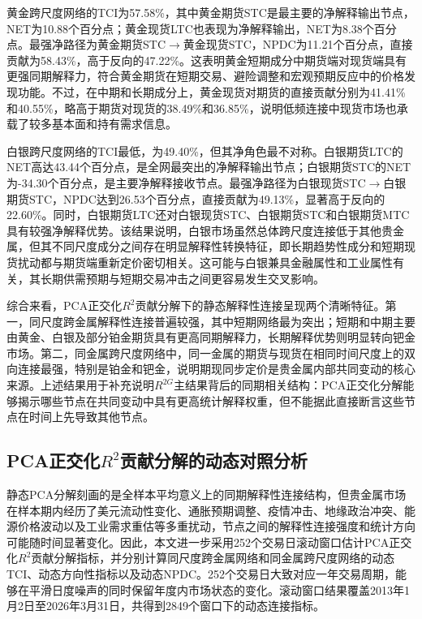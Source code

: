 \documentclass[UTF8,zihao=-4,fontset=fandol]{ctexart}
\begin{document}
黄金跨尺度网络的TCI为57.58\%，其中黄金期货STC是最主要的净解释输出节点，NET为10.88个百分点；黄金现货LTC也表现为净解释输出，NET为8.38个百分点。最强净路径为黄金期货STC$\rightarrow$黄金现货STC，NPDC为11.21个百分点，直接贡献为58.43\%，高于反向的47.22\%。这表明黄金短期成分中期货端对现货端具有更强同期解释力，符合黄金期货在短期交易、避险调整和宏观预期反应中的价格发现功能。不过，在中期和长期成分上，黄金现货对期货的直接贡献分别为41.41\%和40.55\%，略高于期货对现货的38.49\%和36.85\%，说明低频连接中现货市场也承载了较多基本面和持有需求信息。

白银跨尺度网络的TCI最低，为49.40\%，但其净角色最不对称。白银期货LTC的NET高达43.44个百分点，是全网最突出的净解释输出节点；白银期货STC的NET为-34.30个百分点，是主要净解释接收节点。最强净路径为白银现货STC$\rightarrow$白银期货STC，NPDC达到26.53个百分点，直接贡献为49.13\%，显著高于反向的22.60\%。同时，白银期货LTC还对白银现货STC、白银期货STC和白银期货MTC具有较强净解释优势。该结果说明，白银市场虽然总体跨尺度连接低于其他贵金属，但其不同尺度成分之间存在明显解释性转换特征，即长期趋势性成分和短期现货扰动都与期货端重新定价密切相关。这可能与白银兼具金融属性和工业属性有关，其长期供需预期与短期交易冲击之间更容易发生交叉影响。

综合来看，PCA正交化$R^{2}$贡献分解下的静态解释性连接呈现两个清晰特征。第一，同尺度跨金属解释性连接普遍较强，其中短期网络最为突出；短期和中期主要由黄金、白银及部分铂金期货具有更高同期解释力，长期解释优势则明显转向钯金市场。第二，同金属跨尺度网络中，同一金属的期货与现货在相同时间尺度上的双向连接最强，特别是铂金和钯金，说明期现同步定价是贵金属内部共同变动的核心来源。上述结果用于补充说明$R^{2G}$主结果背后的同期相关结构：PCA正交化分解能够揭示哪些节点在共同变动中具有更高统计解释权重，但不能据此直接断言这些节点在时间上先导致其他节点。

\subsection{PCA正交化\texorpdfstring{$R^{2}$}{R2}贡献分解的动态对照分析}

静态PCA分解刻画的是全样本平均意义上的同期解释性连接结构，但贵金属市场在样本期内经历了美元流动性变化、通胀预期调整、疫情冲击、地缘政治冲突、能源价格波动以及工业需求重估等多重扰动，节点之间的解释性连接强度和统计方向可能随时间显著变化。因此，本文进一步采用252个交易日滚动窗口估计PCA正交化$R^{2}$贡献分解指标，并分别计算同尺度跨金属网络和同金属跨尺度网络的动态TCI、动态方向性指标以及动态NPDC。252个交易日大致对应一年交易周期，能够在平滑日度噪声的同时保留年度内市场状态的变化。滚动窗口结果覆盖2013年1月2日至2026年3月31日，共得到2849个窗口下的动态连接指标。
\end{document}
